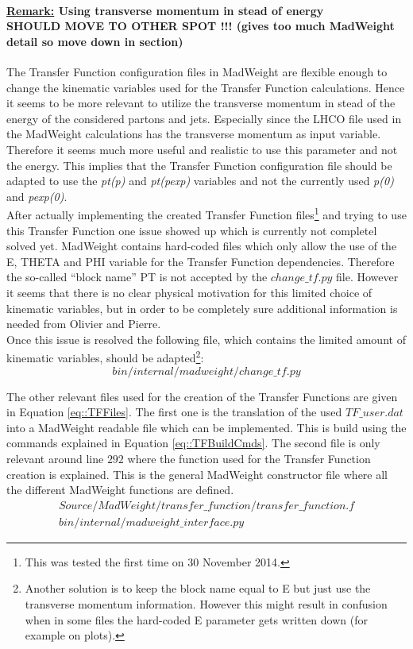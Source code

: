 \paragraph{\underline{Remark:} Using transverse momentum in stead of energy\\ SHOULD MOVE TO OTHER SPOT !!! (gives too much MadWeight detail so move down in section)}
The Transfer Function configuration files in MadWeight are flexible enough to change the kinematic variables used for the Transfer Function calculations. Hence it seems to be more relevant to utilize the transverse momentum in stead of the energy of the considered partons and jets. Especially since the LHCO file used in the MadWeight calculations has the transverse momentum as input variable. Therefore it seems much more useful and realistic to use this parameter and not the energy. This implies that the Transfer Function configuration file should be adapted to use the \textit{pt(p)} and \textit{pt(pexp)} variables and not the currently used \textit{p(0)} and \textit{pexp(0)}.\\
After actually implementing the created Transfer Function files\footnote{This was tested the first time on 30 November 2014.} and trying to use this Transfer Function one issue showed up which is currently not completel solved yet. MadWeight contains hard-coded files which only allow the use of the E, THETA and PHI variable for the Transfer Function dependencies. Therefore the so-called ``block name'' PT is not accepted by the $change\_tf.py$ file. However it seems that there is no clear physical motivation for this limited choice of kinematic variables, but in order to be completely sure additional information is needed from Olivier and Pierre.\\
Once this issue is resolved the following file, which contains the limited amount of kinematic variables, should be adapted\footnote{Another solution is to keep the block name equal to E but just use the transverse momentum information. However this might result in confusion when in some files the hard-coded E parameter gets written down (for example on plots).}:
\begin{equation}
 bin/internal/madweight/change\_tf.py \nonumber
\end{equation}

The other relevant files used for the creation of the Transfer Functions are given in Equation \ref{eq::TFFiles}. The first one is the translation of the used $TF\_user.dat$ into a MadWeight readable file which can be implemented. This is build using the commands explained in Equation \ref{eq::TFBuildCmds}. The second file is only relevant around line $292$ where the function used for the Transfer Function creation is explained. This is the general MadWeight constructor file where all the different MadWeight functions are defined.
\begin{eqnarray} \label{eq::TFFiles}
 Source/MadWeight/transfer\_function/transfer\_function.f \nonumber \\
 bin/internal/madweight\_interface.py \nonumber
\end{eqnarray}

